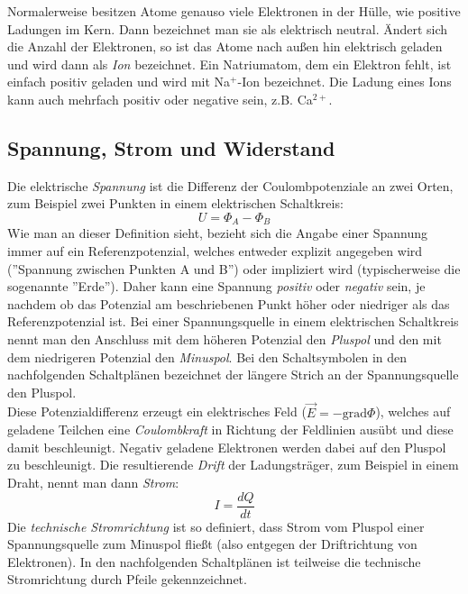 \noindent
Normalerweise besitzen Atome genauso viele Elektronen in der Hülle, wie positive Ladungen im Kern. Dann bezeichnet man sie als elektrisch neutral. Ändert sich die Anzahl der Elektronen, so ist das Atome nach außen hin elektrisch geladen und wird dann als \textit{Ion} bezeichnet. Ein Natriumatom, dem ein Elektron fehlt, ist einfach positiv geladen und wird mit Na$^+$-Ion bezeichnet. Die Ladung eines Ions kann auch mehrfach positiv oder negative sein, z.B. Ca$^{2+}$.

\subsection{Spannung, Strom und Widerstand}

Die elektrische \textit{Spannung} ist die Differenz der Coulombpotenziale an zwei Orten, zum Beispiel zwei Punkten in einem elektrischen Schaltkreis:
\begin{equation}
	U = \Phi_A - \Phi_B
\end{equation}
Wie man an dieser Definition sieht, bezieht sich die Angabe einer Spannung immer auf ein Referenzpotenzial, welches entweder explizit angegeben wird (''Spannung zwischen Punkten A und B'') oder impliziert wird (typischerweise die sogenannte ''Erde''). Daher kann eine Spannung \textit{positiv} oder \textit{negativ} sein, je nachdem ob das Potenzial am beschriebenen Punkt höher oder niedriger als das Referenzpotenzial ist. Bei einer Spannungsquelle in einem elektrischen Schaltkreis nennt man den Anschluss mit dem höheren Potenzial den \textit{Pluspol} und den mit dem niedrigeren Potenzial den \textit{Minuspol}. Bei den Schaltsymbolen in den nachfolgenden Schaltplänen bezeichnet der längere Strich an der Spannungsquelle den Pluspol.\\
Diese Potenzialdifferenz erzeugt ein elektrisches Feld ($\vec{E} = -\mathrm{grad}\Phi$), welches auf geladene Teilchen eine \textit{Coulombkraft} in Richtung der Feldlinien ausübt und diese damit beschleunigt. Negativ geladene Elektronen werden dabei auf den Pluspol zu beschleunigt. Die resultierende \textit{Drift} der Ladungsträger, zum Beispiel in einem Draht, nennt man dann \textit{Strom}:
\begin{equation}
	I = \frac{dQ}{dt}
\end{equation}
Die \textit{technische Stromrichtung} ist so definiert, dass Strom vom Pluspol einer Spannungsquelle zum Minuspol fließt (also entgegen der Driftrichtung von Elektronen). In den nachfolgenden Schaltplänen ist teilweise die technische Stromrichtung durch Pfeile gekennzeichnet.\\

